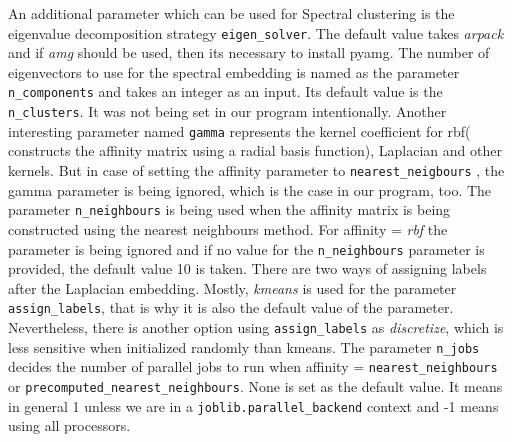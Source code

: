 An additional parameter which can be used for Spectral clustering is the eigenvalue decomposition strategy \verb|eigen_solver|. The default value takes \textit{arpack} and if \textit{amg} should be used, then its necessary to install pyamg. The number of eigenvectors to use for the spectral embedding is named as the parameter \verb|n_components| and takes an integer as an input. Its default value is the \verb|n_clusters|. It was not being set in our program intentionally.
Another interesting parameter named \verb|gamma| represents the kernel coefficient for rbf( constructs the affinity matrix using a radial basis function), Laplacian and other kernels. But in case of setting the affinity parameter to {\verb|nearest_neigbours|} , the gamma parameter is being ignored, which is the case in our program, too. \newline
The parameter \verb|n_neighbours| is being used when the affinity matrix is being constructed using the nearest neighbours method. For affinity = \textit{rbf} the parameter is being ignored and if no value for the \verb|n_neighbours| parameter is provided, the default value 10 is taken. \newline
There are two ways of assigning labels after the Laplacian embedding. Mostly, \textit{kmeans} is used for the parameter \verb|assign_labels|, that is why it is also the default value of the parameter. Nevertheless, there is another option using \verb|assign_labels| as \textit{discretize}, which is less sensitive when initialized randomly than kmeans. The parameter \verb|n_jobs| decides the number of parallel jobs to run when affinity = \verb|nearest_neighbours| or \verb|precomputed_nearest_neighbours|. None is set as the default value. It means in general 1 unless we are in a \verb|joblib.parallel_backend| context and -1  means using all processors. \newline